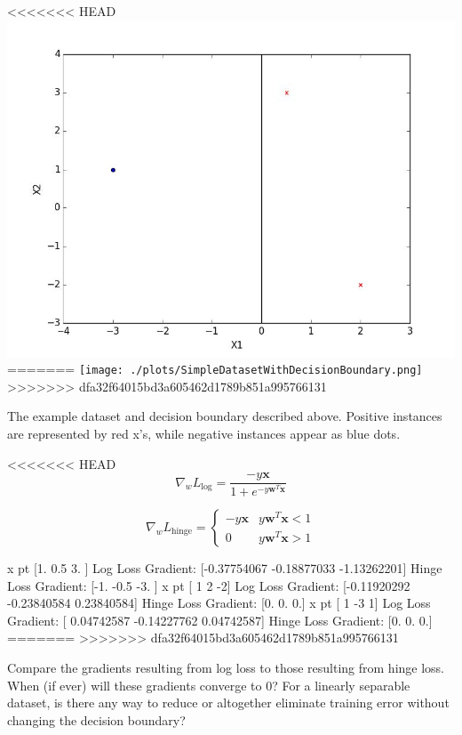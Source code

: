 \begin{center}
<<<<<<< HEAD
  \includegraphics[width=.8\textwidth]{./images/image.jpg}
=======
  \texttt{[image: ./plots/SimpleDatasetWithDecisionBoundary.png]}
>>>>>>> dfa32f64015bd3a605462d1789b851a995766131
\end{center}
\begin{small}
  The example dataset and decision boundary described above. Positive instances are
  represented by red x's, while negative instances appear as blue dots.
\end{small}

\begin{solution}
<<<<<<< HEAD
  \begin{equation}
    \nabla_{w}L_{\text{log}} = \frac{-y\mathbf{x}}{1+e^{-y\mathbf{w}^T\mathbf{x}}}
  \end{equation}
  
  \[
  \nabla_{w}L_{\text{hinge}} = 
   \begin{cases} 
    -y\mathbf{x} & y\mathbf{w}^T\mathbf{x} < 1 \\
    0 & y\mathbf{w}^T\mathbf{x} > 1
 \end{cases}
  \]

x pt
[1.  0.5 3. ]
Log Loss Gradient: 
[-0.37754067 -0.18877033 -1.13262201]
Hinge Loss Gradient:
[-1.  -0.5 -3. ]
x pt
[ 1  2 -2]
Log Loss Gradient: 
[-0.11920292 -0.23840584  0.23840584]
Hinge Loss Gradient:
[0. 0. 0.]
x pt
[ 1 -3  1]
Log Loss Gradient: 
[ 0.04742587 -0.14227762  0.04742587]
Hinge Loss Gradient:
[0. 0. 0.]
=======
>>>>>>> dfa32f64015bd3a605462d1789b851a995766131

\end{solution}

\problem[4]
Compare the gradients resulting from log loss to those resulting from hinge loss. When (if ever) will these gradients converge to 0? For a linearly separable dataset, is there any way to reduce or altogether eliminate training error without changing the decision boundary?

